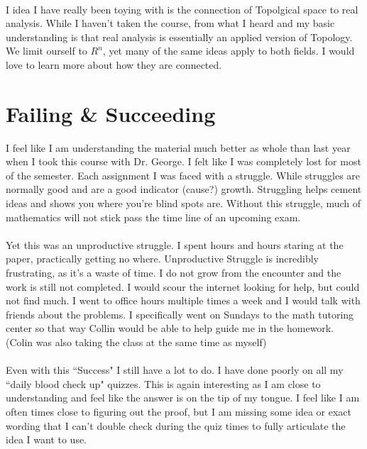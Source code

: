 \documentclass[10pt]{article}
\begin{document}
\\
I idea I have really been toying with is the connection of Topolgical space to real analysis. While I haven't taken the course, from what I heard and my basic understanding is that real analysis is essentially an applied version of Topology. We limit ourself to $ R^n $, yet many of the same ideas apply to both fields. I would love to learn more about how they are connected.\\

\newpage
\section{Failing \& Succeeding}

I feel like I am understanding the material much better as whole than last year when I took this course with Dr. George. I felt like I was completely lost for most of the semester. Each assignment I was faced with a struggle. While struggles are normally good and are a good indicator (cause?) growth. Struggling helps cement ideas and shows you where you're blind spots are. Without this struggle, much of mathematics will not stick pass the time line of an upcoming exam.\\
\\
Yet this was an unproductive struggle. I spent hours and hours staring at the paper, practically getting no where. Unproductive Struggle is incredibly frustrating, as it's a waste of time. I do not grow from the encounter and the work is still not completed.  I would scour the internet looking for help, but could not find much. I went to office hours multiple times a week and I would talk with friends about the problems. I specifically went on Sundays to the math tutoring center so that way Collin would be able to help guide me in the homework. (Colin was also taking the class at the same time as myself)\\
\\
Even with this ``Success" I still have a lot to do. I have done poorly on all my ``daily blood check up" quizzes. This is again interesting as I am close to understanding and feel like the answer is on the tip of my tongue. I feel like I am often times close to figuring out the proof, but I am missing some idea or exact wording that I can't double check during the quiz times to fully articulate the idea I want to use. 

\newpage
\end{document}
